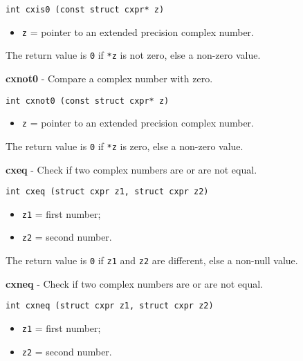 \documentclass{article}
\begin{document}
\begin{verbatim}
int cxis0 (const struct cxpr* z)
\end{verbatim}

\begin{itemize}
\item \texttt{z} = pointer to an extended precision complex number.
\end{itemize}

The return value is \texttt{0} if \texttt{*z} is not zero, else a non-zero value.


\hrulefill{}

\textbf{cxnot0} - Compare a complex number with zero.

\begin{verbatim}
int cxnot0 (const struct cxpr* z)
\end{verbatim}

\begin{itemize}
\item \texttt{z} = pointer to an extended precision complex number.
\end{itemize}

The return value is \texttt{0} if \texttt{*z} is zero, else a non-zero value.


\hrulefill{}

\textbf{cxeq} - Check if two complex numbers are or are not equal.

\begin{verbatim}
int cxeq (struct cxpr z1, struct cxpr z2)
\end{verbatim}

\begin{itemize}
\item \texttt{z1} = first number;
\item \texttt{z2} = second number.
\end{itemize}

The return value is \texttt{0} if \texttt{z1} and \texttt{z2} are different, else a
non-null value.


\hrulefill{}

\textbf{cxneq} - Check if two complex numbers are or are not equal.

\begin{verbatim}
int cxneq (struct cxpr z1, struct cxpr z2)
\end{verbatim}

\begin{itemize}
\item \texttt{z1} = first number;
\item \texttt{z2} = second number.
\end{itemize}
\end{document}
